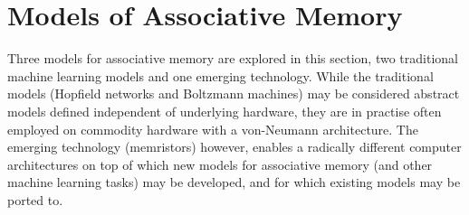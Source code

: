\section{Models of Associative Memory}

Three models for associative memory are explored in this section, two traditional machine learning models and one emerging technology. While the traditional models (Hopfield networks and Boltzmann machines) may be considered abstract models defined independent of underlying hardware, they are in practise often employed on commodity hardware with a von-Neumann architecture. The emerging technology (memristors) however, enables a radically different computer architectures on top of which new models for associative memory (and other machine learning tasks) may be developed, and for which existing models may be ported to.





